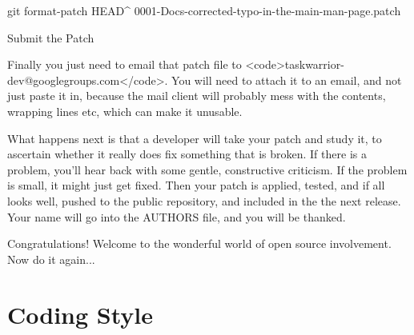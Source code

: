\documentclass[t,handout]{beamer}
\begin{document}
git format-patch HEAD^
0001-Docs-corrected-typo-in-the-main-man-page.patch

Submit the Patch

Finally you just need to email that patch file to
<code>taskwarrior-dev@googlegroups.com</code>.  You will need
to attach it to an email, and not just paste it in, because the
mail client will probably mess with the contents, wrapping lines
etc, which can make it unusable.

What happens next is that a developer will take your patch and
study it, to ascertain whether it really does fix something that
is broken. If there is a problem, you'll hear back with some
gentle, constructive criticism. If the problem is small, it might
just get fixed. Then your patch is applied, tested, and if all
looks well, pushed to the public repository, and included in the
the next release. Your name will go into the AUTHORS file, and
you will be thanked.

Congratulations! Welcome to the wonderful world of open source
involvement. Now do it again...

\fi

\section{Coding Style}

\end{document}
